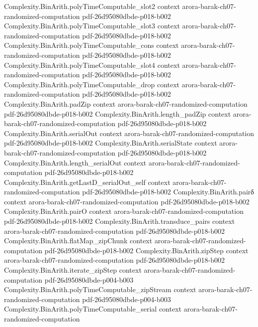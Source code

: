 \begin{theorem}
\proofstep
  {Complexity.BinArith.polyTimeComputable_slot2}
  {context}
  {arora-barak-ch07-randomized-computation}
  {pdf-26d95080dbde-p018-b002}
\proofstep
  {Complexity.BinArith.polyTimeComputable_slot3}
  {context}
  {arora-barak-ch07-randomized-computation}
  {pdf-26d95080dbde-p018-b002}
\proofstep
  {Complexity.BinArith.polyTimeComputable_cons}
  {context}
  {arora-barak-ch07-randomized-computation}
  {pdf-26d95080dbde-p018-b002}
\proofstep
  {Complexity.BinArith.polyTimeComputable_slot4}
  {context}
  {arora-barak-ch07-randomized-computation}
  {pdf-26d95080dbde-p018-b002}
\proofstep
  {Complexity.BinArith.polyTimeComputable_drop}
  {context}
  {arora-barak-ch07-randomized-computation}
  {pdf-26d95080dbde-p018-b002}
\proofstep
  {Complexity.BinArith.padZip}
  {context}
  {arora-barak-ch07-randomized-computation}
  {pdf-26d95080dbde-p018-b002}
\proofstep
  {Complexity.BinArith.length_padZip}
  {context}
  {arora-barak-ch07-randomized-computation}
  {pdf-26d95080dbde-p018-b002}
\proofstep
  {Complexity.BinArith.serialOut}
  {context}
  {arora-barak-ch07-randomized-computation}
  {pdf-26d95080dbde-p018-b002}
\proofstep
  {Complexity.BinArith.serialState}
  {context}
  {arora-barak-ch07-randomized-computation}
  {pdf-26d95080dbde-p018-b002}
\proofstep
  {Complexity.BinArith.length_serialOut}
  {context}
  {arora-barak-ch07-randomized-computation}
  {pdf-26d95080dbde-p018-b002}
\proofstep
  {Complexity.BinArith.getLastD_serialOut_self}
  {context}
  {arora-barak-ch07-randomized-computation}
  {pdf-26d95080dbde-p018-b002}
\proofstep
  {Complexity.BinArith.pairδ}
  {context}
  {arora-barak-ch07-randomized-computation}
  {pdf-26d95080dbde-p018-b002}
\proofstep
  {Complexity.BinArith.pairO}
  {context}
  {arora-barak-ch07-randomized-computation}
  {pdf-26d95080dbde-p018-b002}
\proofstep
  {Complexity.BinArith.transduce_pairs}
  {context}
  {arora-barak-ch07-randomized-computation}
  {pdf-26d95080dbde-p018-b002}
\proofstep
  {Complexity.BinArith.flatMap_zipChunk}
  {context}
  {arora-barak-ch07-randomized-computation}
  {pdf-26d95080dbde-p018-b002}
\proofstep
  {Complexity.BinArith.zipStep}
  {context}
  {arora-barak-ch07-randomized-computation}
  {pdf-26d95080dbde-p018-b002}
\proofstep
  {Complexity.BinArith.iterate_zipStep}
  {context}
  {arora-barak-ch07-randomized-computation}
  {pdf-26d95080dbde-p004-b003}
\proofstep
  {Complexity.BinArith.polyTimeComputable_zipStream}
  {context}
  {arora-barak-ch07-randomized-computation}
  {pdf-26d95080dbde-p004-b003}
\proofstep
  {Complexity.BinArith.polyTimeComputable_serial}
  {context}
  {arora-barak-ch07-randomized-computation}

\end{theorem}
